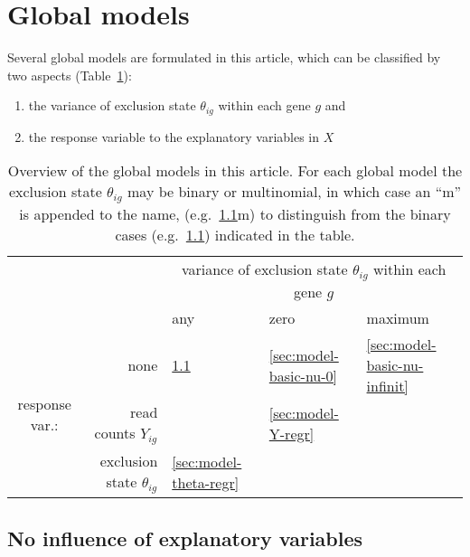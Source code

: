 \documentclass[letterpaper]{article}
\begin{document}
\section{Global models}
\label{sec:models}

Several global models are formulated in this article, which can be classified
by two aspects (Table~\ref{tab:model-overview}):
\begin{enumerate}
\item
the variance
of exclusion state \(\theta_{ig}\) within each gene \(g\) and
\item the response variable to the explanatory variables in \(X\)
\end{enumerate}

\begin{table}[b]
\begin{tabular}{cr|p{2.2 cm}p{2.2 cm}p{2.2 cm}|}
& & \multicolumn{3}{c|}{ variance of exclusion state \(\theta_{ig}\) within each gene \(g\) } \\
& & any & zero & maximum  \\
\hline
\multirow{3}{*}{response var.:} & none & \ref{sec:model-basic} & \ref{sec:model-basic-nu-0} & \ref{sec:model-basic-nu-infinit} \\
& read counts
\(Y_{ig}\) & & \ref{sec:model-Y-regr} & \\
& exclusion state \(\theta_{ig}\) & \ref{sec:model-theta-regr} & & \\
\hline
\end{tabular}
\caption{
Overview of the global models in this article.  For each global model the
exclusion state \(\theta_{ig}\) may be binary or multinomial, in which case an
``m'' is appended to the name, (e.g.~\ref{sec:model-basic}m) to distinguish from
the binary cases (e.g.~\ref{sec:model-basic}) indicated in the table.
}
\label{tab:model-overview}
\end{table}

\renewcommand{\thesubsection}{M\arabic{model}}

\subsection{No influence of explanatory variables }
\label{sec:model-basic}

\end{document}
